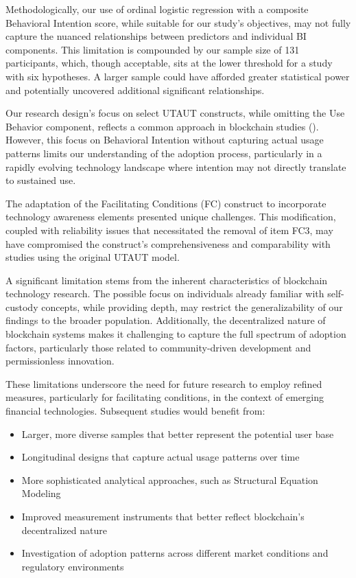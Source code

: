 \documentclass[twocolumn]{article}
\begin{document}
Methodologically, our use of ordinal logistic regression with a composite Behavioral Intention score, while suitable for our study's objectives, may not fully capture the nuanced relationships between predictors and individual BI components. This limitation is compounded by our sample size of 131 participants, which, though acceptable, sits at the lower threshold for a study with six hypotheses. A larger sample could have afforded greater statistical power and potentially uncovered additional significant relationships.

Our research design's focus on select UTAUT constructs, while omitting the Use Behavior component, reflects a common approach in blockchain studies (\cite{chang_acceptance_2022,queiroz_blockchain_2019}). However, this focus on Behavioral Intention without capturing actual usage patterns limits our understanding of the adoption process, particularly in a rapidly evolving technology landscape where intention may not directly translate to sustained use.

The adaptation of the Facilitating Conditions (FC) construct to incorporate technology awareness elements presented unique challenges. This modification, coupled with reliability issues that necessitated the removal of item FC3, may have compromised the construct's comprehensiveness and comparability with studies using the original UTAUT model. 

A significant limitation stems from the inherent characteristics of blockchain technology research. The possible focus on individuals already familiar with self-custody concepts, while providing depth, may restrict the generalizability of our findings to the broader population. Additionally, the decentralized nature of blockchain systems makes it challenging to capture the full spectrum of adoption factors, particularly those related to community-driven development and permissionless innovation.

These limitations underscore the need for future research to employ refined measures, particularly for facilitating conditions, in the context of emerging financial technologies. Subsequent studies would benefit from:
\begin{itemize}
    \item Larger, more diverse samples that better represent the potential user base
    \item Longitudinal designs that capture actual usage patterns over time
    \item More sophisticated analytical approaches, such as Structural Equation Modeling
    \item Improved measurement instruments that better reflect blockchain's decentralized nature
    \item Investigation of adoption patterns across different market conditions and regulatory environments
\end{itemize}
\end{document}

